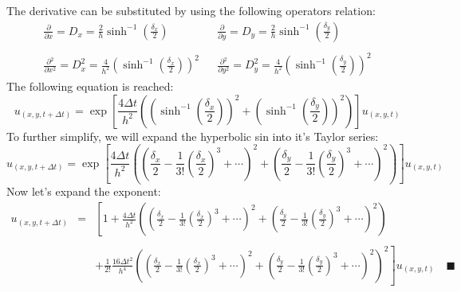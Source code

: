 \documentclass[11pt, a4paper]{article}
\newcommand{\parder}[2]{\frac{\partial {#1}}{\partial {#2}}}
\begin{document}
The derivative can be substituted by using the following operators relation:
\begin{equation}
    \begin{matrix}
        \displaystyle \parder{}{x}=D_x=\frac{2}{h}\sinh^{-1}{\left(\frac{\delta_x}{2}\right)} && \displaystyle \parder{}{y}=D_y=\frac{2}{h}\sinh^{-1}{\left(\frac{\delta_y}{2}\right)} \\\\
        \displaystyle \parder{^2}{x^2}=D_x^2=\frac{4}{h^2}\left(\sinh^{-1}{\left(\frac{\delta_x}{2}\right)}\right)^2 && \displaystyle \parder{^2}{y^2}=D_y^2=\frac{4}{h^2}\left(\sinh^{-1}{\left(\frac{\delta_y}{2}\right)}\right)^2
    \end{matrix}
\end{equation}
The following equation is reached:
\begin{equation}
    \displaystyle u_{\left(x,y,t+\Delta t\right)}=\exp{\left[\frac{4\Delta t}{h^2}\left(\left(\sinh^{-1}{\left(\frac{\delta_x}{2}\right)}\right)^2+\left(\sinh^{-1}{\left(\frac{\delta_y}{2}\right)}\right)^2\right)\right]}u_{\left(x,y,t\right)}
\end{equation}
To further simplify, we will expand the hyperbolic sin into it's Taylor series:
\begin{equation}
    \displaystyle u_{\left(x,y,t+\Delta t\right)}=\exp{\left[\frac{4\Delta t}{h^2}\left(\left(\frac{\delta_x}{2}-\frac{1}{3!}\left(\frac{\delta_x}{2}\right)^3+\cdots\right)^2+\left(\frac{\delta_y}{2}-\frac{1}{3!}\left(\frac{\delta_y}{2}\right)^3+\cdots\right)^2\right)\right]}u_{\left(x,y,t\right)}
\end{equation}
Now let's expand the exponent:
\begin{equation}
    \begin{array}{rcl}
        \displaystyle u_{\left(x,y,t+\Delta t\right)} & = & \displaystyle \left[1+\frac{4\Delta t}{h^2}\left(\left(\frac{\delta_x}{2}-\frac{1}{3!}\left(\frac{\delta_x}{2}\right)^3+\cdots\right)^2+\left(\frac{\delta_y}{2}-\frac{1}{3!}\left(\frac{\delta_y}{2}\right)^3+\cdots\right)^2\right)\right. \\\\
        && \displaystyle +\left.\frac{1}{2!}\frac{16\Delta t^2}{h^4}\left(\left(\frac{\delta_x}{2}-\frac{1}{3!}\left(\frac{\delta_x}{2}\right)^3+\cdots\right)^2+\left(\frac{\delta_y}{2}-\frac{1}{3!}\left(\frac{\delta_y}{2}\right)^3+\cdots\right)^2\right)^2\right]u_{\left(x,y,t\right)}\quad\blacksquare
    \end{array}
\end{equation}
\end{document}
